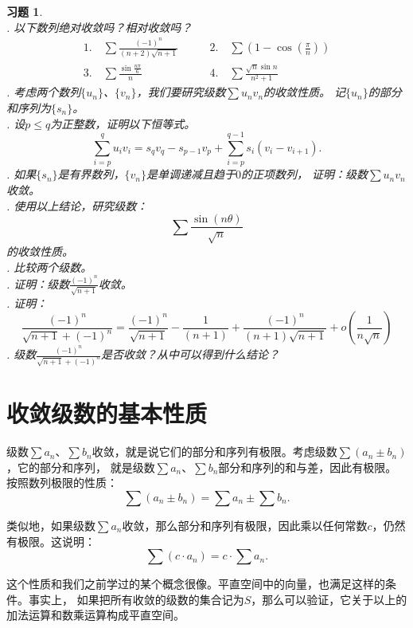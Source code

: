 \documentclass[12pt,UTF8]{ctexbook}
\newcommand{\olim}[1]{\mathit{o}\left(#1\right)}  %
\newtheorem{xt}{习题}[section]
\begin{document}
\begin{xt}
    \mbox{} \\
    . 以下数列绝对收敛吗？相对收敛吗？\\
    $$
    \begin{array}{ll}
        1. \quad \sum \frac{(-1)^n}{(n + 2)\sqrt{n + 1}} \qquad &2. \quad \sum \left(1 - \cos{\left(\frac{\pi}{n}\right)}\right) \\
        3. \quad \sum \frac{\sin{\frac{n\pi}{6}}}{n} \qquad &4. \quad \sum \frac{\sqrt{n}\sin{n}}{n^2 + 1} 
    \end{array}
    $$ 
    . 考虑两个数列$\{u_n\}$、$\{v_n\}$，我们要研究级数$\sum u_n v_n$的收敛性质。
    记$\{u_n\}$的部分和序列为$\{s_n\}$。\\
    . 设$p \leqslant q$为正整数，证明以下恒等式。
    $$ \sum_{i=p}^q u_i v_i = s_q v_q - s_{p-1} v_p + \sum_{i=p}^{q-1} s_i (v_i - v_{i+1}). $$
    . 如果$\{s_n\}$是有界数列，$\{v_n\}$是单调递减且趋于$0$的正项数列，
    证明：级数$\sum u_n v_n$收敛。\\
    . 使用以上结论，研究级数：
    $$ \sum \frac{\sin{(n\theta)}}{\sqrt{n}}$$
    的收敛性质。\\
    . 比较两个级数。\\
    . 证明：级数$\frac{(-1)^n}{\sqrt{n + 1}}$收敛。\\
    . 证明：
    $$\frac{(-1)^n}{\sqrt{n + 1} + (-1)^n} = \frac{(-1)^n}{\sqrt{n + 1}} - \frac{1}{(n + 1)} + \frac{(-1)^n}{(n + 1)\sqrt{n + 1}} + \olim{\frac{1}{n\sqrt{n}}}$$
    . 级数$\frac{(-1)^n}{\sqrt{n + 1} + (-1)^n}$是否收敛？从中可以得到什么结论？
    
\end{xt}

\section{收敛级数的基本性质}

级数$\sum a_n$、$\sum b_n$收敛，就是说它们的部分和序列有极限。考虑级数$\sum (a_n \pm b_n)$，它的部分和序列，
就是级数$\sum a_n$、$\sum b_n$部分和序列的和与差，因此有极限。按照数列极限的性质：
$$\sum (a_n \pm b_n) = \sum a_n \pm \sum b_n.$$

类似地，如果级数$\sum a_n$收敛，那么部分和序列有极限，因此乘以任何常数$c$，仍然有极限。这说明：
$$\sum (c \cdot a_n) = c\cdot \sum a_n.$$

这个性质和我们之前学过的某个概念很像。平直空间中的向量，也满足这样的条件。事实上，
如果把所有收敛的级数的集合记为$S$，那么可以验证，它关于以上的加法运算和数乘运算构成平直空间。
\end{document}
